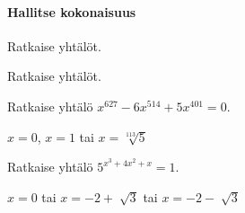 \begin{tehtavasivu}
\paragraph*{Hallitse kokonaisuus}

\begin{tehtava}
Ratkaise yhtälöt.
\begin{alakohdat}
\end{alakohdat}
\begin{vastaus}
\begin{alakohdat}
\end{alakohdat}
\end{vastaus}
\end{tehtava}

\begin{tehtava}
    Ratkaise yhtälöt.
    \begin{alakohdat}
    \end{alakohdat}
    \begin{vastaus}
        \begin{alakohdat}
        \end{alakohdat}
    \end{vastaus}
\end{tehtava}

\begin{tehtava}
	Ratkaise yhtälö $x^{627} - 6x^{514} + 5x^{401} = 0$.
	\begin{vastaus}
		$x = 0$, $x = 1$ tai $x = \sqrt[113]{5}$
	\end{vastaus}
\end{tehtava}


\begin{tehtava}
 	Ratkaise yhtälö $5^{x^3+4x^2+x}=1$. 
	\begin{vastaus}
	$x=0$ tai $x=-2 + \sqrt[]{3}$ tai $x=-2 - \sqrt[]{3}$
	\end{vastaus}
\end{tehtava}


\end{tehtavasivu}
